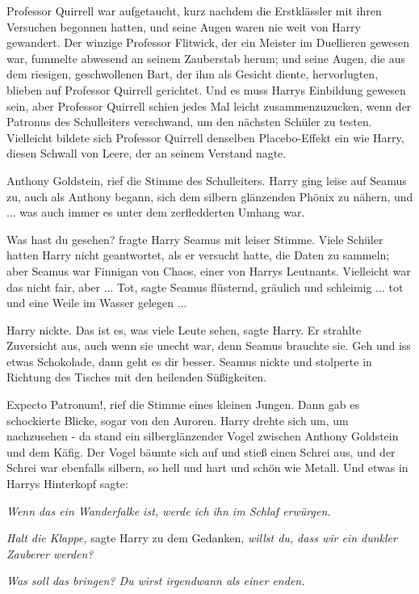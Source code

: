 Professor Quirrell war aufgetaucht, kurz nachdem die Erstklässler mit ihren
Versuchen begonnen hatten, und seine Augen waren nie weit von Harry gewandert.
Der winzige Professor Flitwick, der ein Meister im Duellieren gewesen war,
fummelte abwesend an seinem Zauberstab herum; und seine Augen, die aus dem
riesigen, geschwollenen Bart, der ihm als Gesicht diente, hervorlugten, blieben
auf Professor Quirrell gerichtet. Und es muss Harrys Einbildung gewesen sein,
aber Professor Quirrell schien jedes Mal leicht zusammenzuzucken, wenn der
Patronus des Schulleiters verschwand, um den nächsten Schüler zu testen.
Vielleicht bildete sich Professor Quirrell denselben Placebo-Effekt ein wie
Harry, diesen Schwall von Leere, der an seinem Verstand nagte.

\glqq{}Anthony Goldstein\grqq{}, rief die Stimme des Schulleiters. Harry ging
leise auf Seamus zu, auch als Anthony begann, sich dem silbern glänzenden Phönix
zu nähern, und ... was auch immer es unter dem zerfledderten Umhang war.

\glqq{}Was hast du gesehen?\grqq{} fragte Harry Seamus mit leiser Stimme. Viele
Schüler hatten Harry nicht geantwortet, als er versucht hatte, die Daten zu
sammeln; aber Seamus war Finnigan von Chaos, einer von Harrys Leutnants.
Vielleicht war das nicht fair, aber ... \glqq{}Tot\grqq{}, sagte Seamus flüsternd,
\glqq{}gräulich und schleimig ... tot und eine Weile im Wasser gelegen ...\grqq{}

Harry nickte. \glqq{}Das ist es, was viele Leute sehen\grqq{}, sagte Harry. Er
strahlte Zuversicht aus, auch wenn sie unecht war, denn Seamus brauchte sie.
\glqq{}Geh und iss etwas Schokolade, dann geht es dir besser.\grqq{} Seamus nickte und
stolperte in Richtung des Tisches mit den heilenden Süßigkeiten.

\glqq{}Expecto Patronum!\grqq{}, rief die Stimme eines kleinen Jungen. Dann gab
es schockierte Blicke, sogar von den Auroren. Harry drehte sich um, um
nachzusehen - da stand ein silberglänzender Vogel zwischen Anthony Goldstein und
dem Käfig. Der Vogel bäumte sich auf und stieß einen Schrei aus, und der Schrei
war ebenfalls silbern, so hell und hart und schön wie Metall. Und etwas in
Harrys Hinterkopf sagte:

\emph{Wenn das ein Wanderfalke ist, werde ich ihn im Schlaf erwürgen.}

\emph{Halt die Klappe,} sagte Harry zu dem Gedanken, \emph{willst du, dass wir
ein dunkler Zauberer werden?}

\emph{Was soll das bringen? Du wirst irgendwann als einer enden.}

